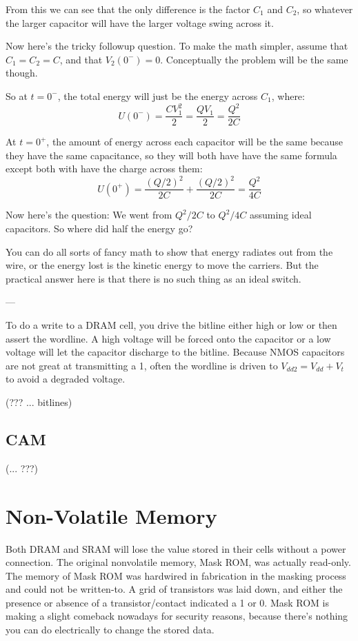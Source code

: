 \documentclass{article}
\begin{document}
From this we can see that the only difference is the factor $C_1$ and $C_2$, so whatever the larger capacitor will have the larger voltage swing across it.

Now here's the tricky followup question. To make the math simpler, assume that $C_1 = C_2 = C$, and that $V_2(0^-) = 0$. Conceptually the problem will be the same though.

So at $t=0^-$, the total energy will just be the energy across $C_1$, where: $$U(0^-)=\dfrac{C V_1^2}{2} = \frac{Q V_1}{2} = \frac{Q^2}{2C}$$ 

At $t=0^+$, the amount of energy across each capacitor will be the same because they have the same capacitance, so they will both have have the same formula except both with have the charge across them: $$U(0^+) = \frac{(Q/2)^2}{2C} + \frac{(Q/2)^2}{2C} = \frac{Q^2}{4C}$$ 

Now here's the question: We went from $Q^2/2C$ to $Q^2/4C$ assuming ideal capacitors. So where did half the energy go?

You can do all sorts of fancy math to show that energy radiates out from the wire, or the energy lost is the kinetic energy to move the carriers. But the practical answer here is that there is no such thing as an ideal switch. 

---

To do a write to a DRAM cell, you drive the bitline either high or low or then assert the wordline. A high voltage will be forced onto the capacitor or a low voltage will let the capacitor discharge to the bitline. Because NMOS capacitors are not great at transmitting a 1, often the wordline is driven to $V_{dd2} = V_{dd} + V_t$ to avoid a degraded voltage. 

(??? ... bitlines)

\subsection{CAM}

(... ???)

\section{Non-Volatile Memory}

Both DRAM and SRAM will lose the value stored in their cells without a power connection. The original nonvolatile memory, Mask ROM, was actually read-only. The memory of Mask ROM was hardwired in fabrication in the masking process and could not be written-to. A grid of transistors was laid down, and either the presence or absence of a transistor/contact indicated a 1 or 0. Mask ROM is making a slight comeback nowadays for security reasons, because there's nothing you can do electrically to change the stored data. 
\end{document}
